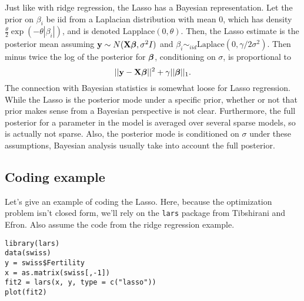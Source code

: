 Just like with ridge regression, the Lasso has a Bayesian representation. Let
the prior on $\beta_i$ be iid from a Laplacian distribution with mean 0, which has
density $\frac{\theta}{2}\exp(- \theta |\beta_i|)$, and is denoted Lapplace$(0, \theta)$. 
Then, the Lasso estimate is
the posterior mean assuming $\mathbf{y} \sim N(\mathbf{X} \boldsymbol{\beta}, \sigma^2 I)$ and 
$\beta_i \sim_{iid} \mbox{Laplace}(0, \gamma / 2\sigma^2)$. Then minus twice 
the log of the posterior for $\boldsymbol{\beta}$, conditioning on $\sigma$, is proportional to
$$
||\mathbf{y} - \mathbf{X} \boldsymbol{\beta}||^2 + \gamma ||\boldsymbol{\beta}||_{1}.
$$
The connection with Bayesian statistics is somewhat loose for Lasso regression. 
While the Lasso is the posterior mode under a specific prior, whether or not that
prior makes sense from a Bayesian perspective is not clear. Furthermore, the full
posterior for a parameter in the model 
is averaged over several sparse models, so is actually not sparse. 
Also, the posterior mode is conditioned on $\sigma$ under these assumptions, Bayesian analysis usually
take into account the full posterior.


\subsection{Coding example}

Let's give an example of coding the Lasso. Here, because the optimization
problem isn't closed form, we'll rely on the \texttt{lars} package from
Tibshirani and Efron. Also assume the code from the ridge regression example.

\begin{verbatim}
library(lars)
data(swiss)
y = swiss$Fertility
x = as.matrix(swiss[,-1])
fit2 = lars(x, y, type = c("lasso"))
plot(fit2)
\end{verbatim}



